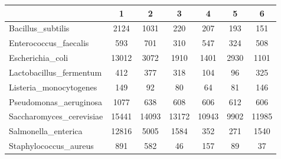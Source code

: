 \begin{tabular}{|l||c|c|c|c|c|c|}
\hline
& 1 & 2 & 3 & 4 & 5 & 6 \\
\hline
\hline
Bacillus\_subtilis & \cellcolor[RGB]{235, 71, 71} 2124 & \cellcolor[RGB]{235, 71, 71} 1031 & \cellcolor[RGB]{253, 241, 241} 220 & \cellcolor[RGB]{246, 246, 254} 207 & \cellcolor[RGB]{223, 223, 251} 193 & \cellcolor[RGB]{94, 94, 237} 151 \\
\hline
Enterococcus\_faecalis & \cellcolor[RGB]{253, 237, 237} 593 & \cellcolor[RGB]{250, 209, 209} 701 & \cellcolor[RGB]{218, 218, 251} 310 & \cellcolor[RGB]{254, 250, 250} 547 & \cellcolor[RGB]{218, 218, 251} 324 & \cellcolor[RGB]{250, 250, 254} 508 \\
\hline
Escherichia\_coli & \cellcolor[RGB]{235, 71, 71} 13012 & \cellcolor[RGB]{252, 232, 232} 3072 & \cellcolor[RGB]{241, 241, 253} 1910 & \cellcolor[RGB]{227, 227, 252} 1401 & \cellcolor[RGB]{253, 237, 237} 2930 & \cellcolor[RGB]{218, 218, 251} 1101 \\
\hline
Lactobacillus\_fermentum & \cellcolor[RGB]{252, 232, 232} 412 & \cellcolor[RGB]{253, 241, 241} 377 & \cellcolor[RGB]{255, 255, 255} 318 & \cellcolor[RGB]{218, 218, 251} 104 & \cellcolor[RGB]{218, 218, 251} 96 & \cellcolor[RGB]{255, 255, 255} 325 \\
\hline
Listeria\_monocytogenes & \cellcolor[RGB]{235, 71, 71} 149 & \cellcolor[RGB]{252, 232, 232} 92 & \cellcolor[RGB]{232, 232, 252} 80 & \cellcolor[RGB]{172, 172, 246} 64 & \cellcolor[RGB]{237, 237, 253} 81 & \cellcolor[RGB]{235, 71, 71} 146 \\
\hline
Pseudomonas\_aeruginosa & \cellcolor[RGB]{235, 71, 71} 1077 & \cellcolor[RGB]{235, 71, 71} 638 & \cellcolor[RGB]{241, 241, 253} 608 & \cellcolor[RGB]{227, 227, 252} 606 & \cellcolor[RGB]{253, 237, 237} 612 & \cellcolor[RGB]{227, 227, 252} 606 \\
\hline
Saccharomyces\_cerevisiae & \cellcolor[RGB]{247, 186, 186} 15441 & \cellcolor[RGB]{251, 218, 218} 14093 & \cellcolor[RGB]{253, 241, 241} 13172 & \cellcolor[RGB]{223, 223, 251} 10943 & \cellcolor[RGB]{205, 205, 249} 9902 & \cellcolor[RGB]{246, 246, 254} 11985 \\
\hline
Salmonella\_enterica & \cellcolor[RGB]{235, 71, 71} 12816 & \cellcolor[RGB]{235, 71, 71} 5005 & \cellcolor[RGB]{255, 255, 255} 1584 & \cellcolor[RGB]{218, 218, 251} 352 & \cellcolor[RGB]{218, 218, 251} 271 & \cellcolor[RGB]{255, 255, 255} 1540 \\
\hline
Staphylococcus\_aureus & \cellcolor[RGB]{235, 71, 71} 891 & \cellcolor[RGB]{235, 71, 71} 582 & \cellcolor[RGB]{227, 227, 252} 46 & \cellcolor[RGB]{253, 241, 241} 157 & \cellcolor[RGB]{241, 241, 253} 89 & \cellcolor[RGB]{223, 223, 251} 37 \\
\hline
\end{tabular}
